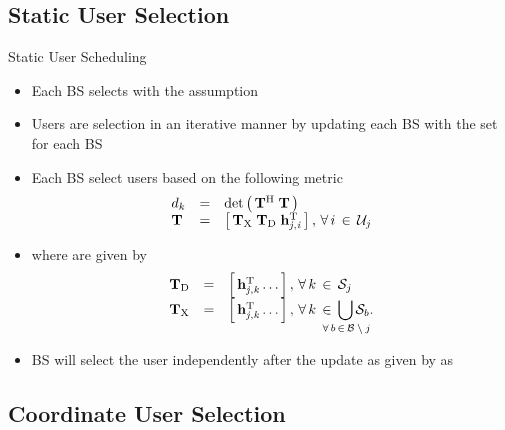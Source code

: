 \documentclass{beamer}
\begin{document}
\subsection{Static User Selection}

\begin{frame}
\begin{block}{Static User Scheduling}
\begin{itemize}
  \item Each BS selects  with the assumption 
  \item Users are selection in an iterative manner by updating each BS with the set  for each BS 
  \item Each BS select users based on the following metric
  \begin{equation*}
  \begin{array}{lcl}
  d_k &=& \det \left ( \, \mathbf{T}^{\mathrm{H}} \; \mathbf{T} \, \right ) \\
  \mathbf{T} &=& \left [ \, \mathbf{T}_{\mathrm{X}} \; \mathbf{T}_{\mathrm{D}} \; \mathbf{h}_{\mathit{j},\mathit{i}}^{\mathrm{T}} \, \right ], \, \forall \, i \, \in \, \mathcal{U}_j
  \end{array}
  \end{equation*}
  \item where  are given by
  \begin{equation*}
  \begin{array}{lcl}
  \mbf{T}_{\mrm{D}} &=& \matscont{\mvecxyz{h}{j}{k}^\mrm{T} \dotso}, \fall k \inm \mc{S}_j \\
  \mbf{T}_{\mrm{X}} &=& \matscont{\mvecxyz{h}{j}{k}^\mrm{T} \dotso }, \fall k \inm \displaystyle \bigcup_{\mathclap{\fall b \inm \mc{B} \bs j}} \mc{S}_b.
  \end{array}
  \end{equation*}
  \item BS will select the user independently after the update as given by  as 
\end{itemize}
\end{block}
\end{frame}

\subsection{Coordinate User Selection}
\end{document}
